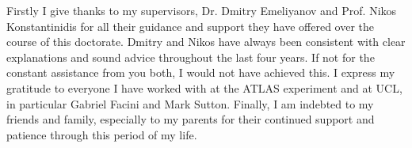 Firstly I give thanks to my supervisors, Dr. Dmitry Emeliyanov and Prof. Nikos Konstantinidis for all their guidance and support they have offered over the course of this doctorate. Dmitry and Nikos have always been consistent with clear explanations and sound advice throughout the last four years. If not for the constant assistance from you both, I would not have achieved this. I express my gratitude to everyone I have worked with at the ATLAS experiment and at UCL, in particular Gabriel Facini and Mark Sutton. Finally, I am indebted to my friends and family, especially to my parents for their continued support and patience through this period of my life.
